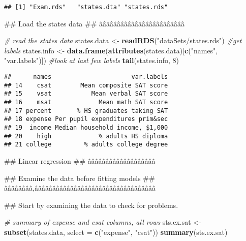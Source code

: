 \documentclass[]{article}
\newenvironment{Shaded}{\begin{snugshade}}{\end{snugshade}}
\newcommand{\KeywordTok}[1]{\textcolor[rgb]{0.13,0.29,0.53}{\textbf{#1}}}
\newcommand{\DataTypeTok}[1]{\textcolor[rgb]{0.13,0.29,0.53}{#1}}
\newcommand{\DecValTok}[1]{\textcolor[rgb]{0.00,0.00,0.81}{#1}}
\newcommand{\StringTok}[1]{\textcolor[rgb]{0.31,0.60,0.02}{#1}}
\newcommand{\CommentTok}[1]{\textcolor[rgb]{0.56,0.35,0.01}{\textit{#1}}}
\newcommand{\NormalTok}[1]{#1}
\begin{document}
\begin{verbatim}
## [1] "Exam.rds"   "states.dta" "states.rds"
\end{verbatim}

\begin{Shaded}
\begin{Highlighting}[]
\NormalTok{## Load the states data}
\NormalTok{## ââââââââââââââââââââââââ}

\CommentTok{# read the states data}
\NormalTok{states.data <-}\StringTok{ }\KeywordTok{readRDS}\NormalTok{(}\StringTok{"dataSets/states.rds"}\NormalTok{) }
\CommentTok{#get labels}
\NormalTok{states.info <-}\StringTok{ }\KeywordTok{data.frame}\NormalTok{(}\KeywordTok{attributes}\NormalTok{(states.data)[}\KeywordTok{c}\NormalTok{(}\StringTok{"names"}\NormalTok{, }\StringTok{"var.labels"}\NormalTok{)])}
\CommentTok{#look at last few labels}
\KeywordTok{tail}\NormalTok{(states.info, }\DecValTok{8}\NormalTok{)}
\end{Highlighting}
\end{Shaded}

\begin{verbatim}
##      names                      var.labels
## 14    csat        Mean composite SAT score
## 15    vsat           Mean verbal SAT score
## 16    msat             Mean math SAT score
## 17 percent       % HS graduates taking SAT
## 18 expense Per pupil expenditures prim&sec
## 19  income Median household income, $1,000
## 20    high             % adults HS diploma
## 21 college         % adults college degree
\end{verbatim}

\begin{Shaded}
\begin{Highlighting}[]
\NormalTok{## Linear regression}
\NormalTok{## âââââââââââââââââââ}

\NormalTok{## Examine the data before fitting models}
\NormalTok{## ââââââââ,ââââââââââââââââââââââââââââââââââ}

\NormalTok{##   Start by examining the data to check for problems.}

\CommentTok{# summary of expense and csat columns, all rows}
\NormalTok{sts.ex.sat <-}\StringTok{ }\KeywordTok{subset}\NormalTok{(states.data, }\DataTypeTok{select =} \KeywordTok{c}\NormalTok{(}\StringTok{"expense"}\NormalTok{, }\StringTok{"csat"}\NormalTok{))}
\KeywordTok{summary}\NormalTok{(sts.ex.sat)}
\end{Highlighting}
\end{Shaded}
\end{document}
